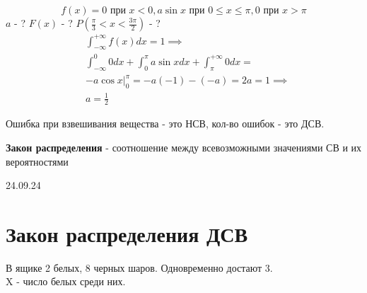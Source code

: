\begin{opr}
\begin{itemize}
\begin{opr}
                    \begin{ex}
                        \begin{equation}
                            f(x) = 0 \text{ при } x < 0, 
                            a\sin x \text{ при } 0\leq x \leq \pi, 
                            0 \text{ при } x > \pi
                        \end{equation}
                        \(a\) - ? \(F(x)\) - ? \(P(\frac{\pi}{3} < x < \frac{3\pi}{2})\) - ?
                        \begin{equation}
                            \begin{align*}
                                &\int_{-\infty}^{+\infty} f(x)dx = 1 \implies\\
                                &\int_{-\infty}^{0} 0dx + \int_{0}^{\pi} a\sin x dx + \int_{\pi}^{+\infty} 0 dx = \\
                                &-a\cos x |^{\pi}_{0} = -a(-1) - (-a) = 2a = 1 \implies\\
                                &a = \frac{1}{2}
                            \end{align*}
                        \end{equation}
                    \end{ex}
                  \end{opr}
        \end{itemize}
        \begin{ex}
            Ошибка при взвешивания вещества - это НСВ, кол-во ошибок - это ДСВ. 
        \end{ex}
    \end{opr}

    \begin{opr}
        \textbf{Закон распределения} - соотношение между
        всевозможными значениями СВ и их вероятностями
    \end{opr}



    \vspace{2cm}
    \begin{center}\large{24.09.24}\end{center}
    \section{Закон распределения ДСВ}
    \begin{ex}
        В ящике 2 белых, 8 черных шаров. Одновременно достают 3.\\
        X - число белых среди них. 
    \end{ex}

